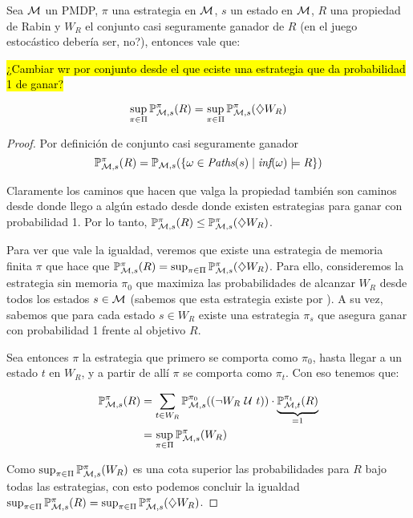 \begin{lemma}
	\label{PMDP-supWR}
	Sea $\mathcal{M}$ un PMDP, $\pi$ una estrategia en $\mathcal{M}$, $s$ un estado en $\mathcal{M}$, $R$ una propiedad de Rabin y $W_R$ el conjunto casi seguramente ganador de $R$ (en el juego estocástico debería ser, no?), entonces vale que:


	\hl{¿Cambiar wr por conjunto desde el que eciste una estrategia que da probabilidad 1 de ganar?}

	$$
		\sup_{\pi \in \Pi} \mathbb{P}_{\mathcal{M}, s}^\pi (R) = \sup_{\pi \in \Pi} \mathbb{P}_{\mathcal{M}, s}^\pi (\diamondsuit W_R)
	$$
\end{lemma}

\begin{proof}
	Por definición de conjunto casi seguramente ganador
	$$
		\mathbb{P}_{\mathcal{M},s}^\pi (R) = \mathbb{P}_{\mathcal{M},s}(\{ \omega \in \textit{Paths}(s) \mid \textit{inf}(\omega) \models R\})
	$$

	Claramente los caminos que hacen que valga la propiedad también son caminos
	desde donde llego a algún estado desde donde existen estrategias para ganar con
	probabilidad 1. Por lo tanto, $\mathbb{P}_{\mathcal{M}, s}^\pi (R) \leq \mathbb{P}_{\mathcal{M}, s}^\pi (\diamondsuit W_R)$.

	Para ver que vale la igualdad, veremos que existe una estrategia de memoria
	finita $\pi$ que hace que $\mathbb{P}_{\mathcal{M}, s}^\pi (R) = \sup_{\pi \in \Pi} \mathbb{P}_{\mathcal{M}, s}^\pi (\diamondsuit
		W_R) $. Para ello, consideremos la estrategia sin memoria $\pi_0$ que maximiza
	las probabilidades de alcanzar $W_R$ desde todos los estados $s \in \mathcal{M}$
	(sabemos que esta estrategia existe por \cite{Polytopal, CONDON1992}). A su
	vez, sabemos que para cada estado $s \in W_R$ existe una estrategia $\pi_s$ que
	asegura ganar con probabilidad 1 frente al objetivo $R$.

	Sea entonces $\pi$ la estrategia que primero se comporta como $\pi_0$, hasta
	llegar a un estado $t$ en $W_R$, y a partir de allí $\pi$ se comporta como
	$\pi_t$. Con eso tenemos que:

	\begin{align*}
		\mathbb{P}_{\mathcal{M}, s}^\pi (R) &= \sum_{t \in W_R} \mathbb{P}_{\mathcal{M},s}^{\pi_0} ((\neg W_R \ \mathcal{U} \  t)) \cdot \underbrace{\mathbb{P}_{\mathcal{M},t}^{\pi_t}(R)}_{=1} \\
		&= \sup_{\pi \in \Pi} \mathbb{P}_{\mathcal{M}, s}^\pi (W_R)
	\end{align*}

	Como $\sup_{\pi \in \Pi} \mathbb{P}_{\mathcal{M}, s}^\pi (W_R)$ es una cota superior las
	probabilidades para $R$ bajo todas las estrategias, con esto podemos concluir
	la igualdad $\sup_{\pi \in \Pi} \mathbb{P}_{\mathcal{M}, s}^\pi (R) = \sup_{\pi \in \Pi} \mathbb{P}_{\mathcal{M}, s}^\pi
		(\diamondsuit W_R)$.
\end{proof}

